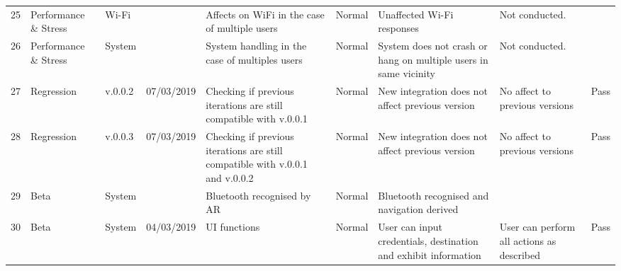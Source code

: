 \begin{adjustbox}{angle=90}
\begin{tabular}{l|l|l|l|p{3cm}|l|p{3cm}|p{3cm}|l}
25      & Performance \& Stress         & Wi-Fi              &                & Affects on WiFi in the case of multiple users                                 & Normal    & Unaffected Wi-Fi responses                                                   & Not conducted.                                                              &             \\
26      & Performance \& Stress         & System             &                & System handling in the case of multiples users                                & Normal    & System does not crash or hang on multiple users in same vicinity             & Not conducted.                                                              &             \\
27      & Regression                    & v.0.0.2            & 07/03/2019     & Checking if previous iterations are still compatible with v.0.0.1             & Normal    & New integration does not affect previous version                             & No affect to previous versions                                              & Pass        \\
28      & Regression                    & v.0.0.3            & 07/03/2019     & Checking if previous iterations are still compatible with v.0.0.1 and v.0.0.2 & Normal    & New integration does not affect previous version                             & No affect to previous versions                                              & Pass        \\
29      & Beta                          & System             &                & Bluetooth recognised by AR                                                    & Normal    & Bluetooth recognised and navigation derived                                  &                                                                             &             \\
30      & Beta                          & System             & 04/03/2019     & UI functions                                                                  & Normal    & User can input credentials, destination and exhibit information              & User can perform all actions as described                                   & Pass        \\
\end{tabular}
\end{adjustbox}